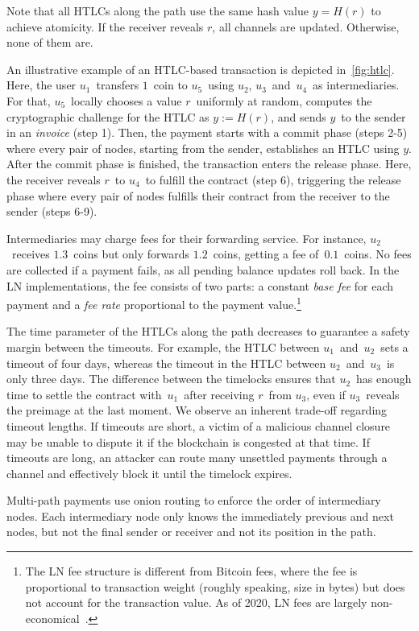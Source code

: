 Note that all HTLCs along the path use the same hash value $y=H(r)$ to achieve atomicity.
If the receiver reveals $r$, all channels are updated.
Otherwise, none of them are.

An illustrative example of an HTLC-based transaction is depicted in~\cref{fig:htlc}.
Here, the user $u_1$~transfers $1$~coin to $u_5$~using $u_2$, $u_3$~and~$u_4$~as intermediaries.
For that, $u_5$~locally chooses a value $r$~uniformly at random, computes the cryptographic challenge for the HTLC as $y := H(r)$, and sends $y$~to the sender in an \textit{invoice} (step 1).
Then, the payment starts with a commit phase (steps 2-5) where every pair of nodes, starting from the sender, establishes an HTLC using $y$.
After the commit phase is finished, the transaction enters the release phase.
Here, the receiver reveals $r$~to $u_4$~to fulfill the contract (step 6), triggering the release phase where every pair of nodes fulfills their contract from the receiver to the sender (steps 6-9).

Intermediaries may charge fees for their forwarding service.
For instance, $u_2$~receives $1.3$~coins but only forwards $1.2$~coins, getting a fee of~$0.1$~coins.
No fees are collected if a payment fails, as all pending balance updates roll back.
In the LN implementations, the fee consists of two parts: a constant \textit{base fee} for each payment and a \textit{fee rate} proportional to the payment value.\footnote{The LN fee structure is different from Bitcoin fees, where the fee is proportional to transaction weight (roughly speaking, size in bytes) but does not account for the transaction value. As of 2020, LN fees are largely non-economical~\cite{Beres2019}.}

The time parameter of the HTLCs along the path decreases to guarantee a safety margin between the timeouts.
For example, the HTLC between $u_1$~and~$u_2$~sets a timeout of four days, whereas the timeout in the HTLC between $u_2$~and~$u_3$~is only three days.
The difference between the timelocks ensures that $u_2$~has enough time to settle the contract with~$u_1$~after receiving $r$~from $u_3$, even if $u_3$~reveals the preimage at the last moment.
We observe an inherent trade-off regarding timeout lengths.
If timeouts are short, a victim of a malicious channel closure may be unable to dispute it if the blockchain is congested at that time.
If timeouts are long, an attacker can route many unsettled payments through a channel and effectively block it until the timelock expires.

Multi-path payments use onion routing to enforce the order of intermediary nodes.
Each intermediary node only knows the immediately previous and next nodes, but not the final sender or receiver and not its position in the path.


